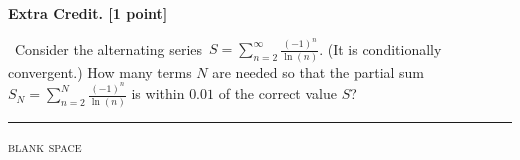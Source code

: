 \documentclass[12pt]{article}
\newcommand{\ds}{\displaystyle}
\begin{document}
\clearpage\newpage
\textbf{\textsf{Extra Credit. [1 point]}} {\large\strut} \, \quad Consider the alternating series\, $\ds S = \sum_{n=2}^\infty \frac{(-1)^n}{\ln(n)}$.  (It is conditionally convergent.)  How many terms $N$ are needed so that the partial sum $\ds S_N = \sum_{n=2}^N \frac{(-1)^n}{\ln(n)}$ is within $0.01$ of the correct value $S$?
\vspace{3.2in}

\noindent \hrule
\medskip
\centerline{\footnotesize \textsc{blank space}}
\vfill
\end{document}
